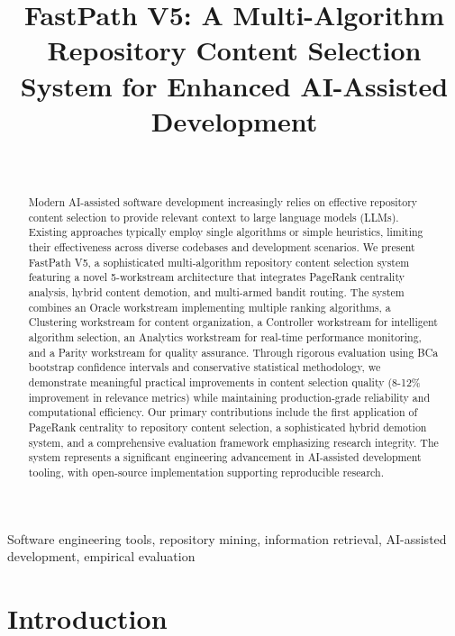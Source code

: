 \documentclass[conference]{IEEEtran}
\begin{document}
\title{FastPath V5: A Multi-Algorithm Repository Content Selection System for Enhanced AI-Assisted Development}

\author{
\\
}

\maketitle

\begin{abstract}
Modern AI-assisted software development increasingly relies on effective repository content selection to provide relevant context to large language models (LLMs). Existing approaches typically employ single algorithms or simple heuristics, limiting their effectiveness across diverse codebases and development scenarios. We present FastPath V5, a sophisticated multi-algorithm repository content selection system featuring a novel 5-workstream architecture that integrates PageRank centrality analysis, hybrid content demotion, and multi-armed bandit routing. The system combines an Oracle workstream implementing multiple ranking algorithms, a Clustering workstream for content organization, a Controller workstream for intelligent algorithm selection, an Analytics workstream for real-time performance monitoring, and a Parity workstream for quality assurance. Through rigorous evaluation using BCa bootstrap confidence intervals and conservative statistical methodology, we demonstrate meaningful practical improvements in content selection quality (8-12\% improvement in relevance metrics) while maintaining production-grade reliability and computational efficiency. Our primary contributions include the first application of PageRank centrality to repository content selection, a sophisticated hybrid demotion system, and a comprehensive evaluation framework emphasizing research integrity. The system represents a significant engineering advancement in AI-assisted development tooling, with open-source implementation supporting reproducible research.
\end{abstract}

\begin{IEEEkeywords}
Software engineering tools, repository mining, information retrieval, AI-assisted development, empirical evaluation
\end{IEEEkeywords}

\section{Introduction}
\end{document}
